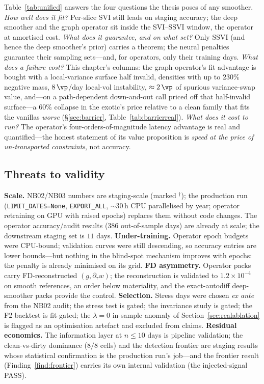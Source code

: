 Table~\ref{tab:unified} answers the four questions the thesis poses of any smoother.
\emph{How well does it fit?} Per-slice SVI still leads on staging accuracy; the deep
smoother and the graph operator sit inside the SVI--SSVI window, the operator at amortised
cost. \emph{What does it guarantee, and on what set?} Only SSVI (and hence the deep
smoother's prior) carries a theorem; the neural penalties guarantee their sampling
sets---and, for operators, only their training days. \emph{What does a failure cost?} This
chapter's columns: the graph operator's fit advantage is bought with a local-variance
surface half invalid, densities with up to $230\%$ negative mass, $8\,\vp$/day
local-vol instability, $\approx2\,\vp$ of spurious variance-swap value, and---on a
path-dependent down-and-out call priced off that half-invalid surface---a $60\%$ collapse in
the exotic's price relative to a clean family that fits the vanillas \emph{worse}
(\S\ref{sec:barrier}, Table~\ref{tab:barrierreal}). \emph{What does
it cost to run?} The operator's four-orders-of-magnitude latency advantage is real and
quantified---the honest statement of its value proposition is \emph{speed at the price of
un-transported constraints}, not accuracy.

\subsection{Threats to validity}

\textbf{Scale.} NB02/NB03 numbers are staging-scale (marked $^\dagger$); the production run
(\texttt{LIMIT\_DATES=None}, \texttt{EXPORT\_ALL}, $\sim$30\,h CPU parallelised by year;
operator retraining on GPU with raised epochs) replaces them without code changes. The
operator accuracy/audit results (386 out-of-sample days) are already at scale; the
downstream staging set is $11$ days. \textbf{Under-training.} Operator epoch budgets were
CPU-bound; validation curves were still descending, so accuracy entries are lower
bounds---but nothing in the blind-spot mechanism improves with epochs: the penalty is
already minimised on its grid. \textbf{FD asymmetry.} Operator packs carry FD-reconstructed
$(g,\partial_\tau w)$; the reconstruction is validated to $1.2\times10^{-4}$ on smooth
references, an order below materiality, and the exact-autodiff deep-smoother packs provide
the control. \textbf{Selection.} Stress days were chosen \emph{ex ante} from the NB02
audit; the stress test is gated; the invariance study is gated; the F2 backtest is
fit-gated; the $\lambda=0$ in-sample anomaly of Section~\ref{sec:realablation} is flagged
as an optimisation artefact and excluded from claims. \textbf{Residual economics.} The
information layer at $n\le10$ days is pipeline validation; the clean-vs-dirty dominance
($8/8$ cells) and the detection frontier are staging results whose statistical confirmation
is the production run's job---and the frontier result (Finding~\ref{find:frontier})
carries its own internal validation (the injected-signal PASS).

